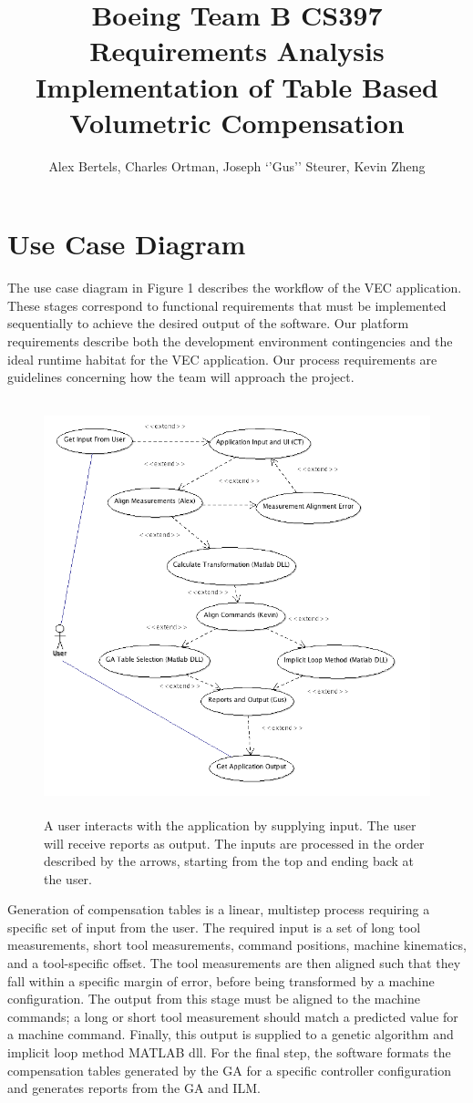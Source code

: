 \documentclass[pdftex,10pt,a4paper]{article}
\title{Boeing Team B CS397 Requirements Analysis\\
{\small Implementation of Table Based Volumetric Compensation} }
\author{Alex Bertels, Charles Ortman, Joseph `'Gus'' Steurer, Kevin Zheng}
\date{}
\begin{document}
\maketitle

\section*{Use Case Diagram}
The use case diagram in Figure 1 describes the workflow of the VEC application. These stages correspond to functional requirements that must be implemented sequentially to achieve the desired output of the software. Our platform requirements describe both the development environment contingencies and the ideal runtime habitat for the VEC application. Our process requirements are guidelines concerning how the team will approach the project.

\begin{figure}[ht!]
\centering
\includegraphics[width=120mm, height=120mm]{UML.png}
\caption{A user interacts with the application by supplying input. The user will receive reports as output. The inputs are processed in the order described by the arrows, starting from the top and ending back at the user.}
\end{figure}

Generation of compensation tables is a linear, multistep process requiring a specific set of input from the user. The required input is a set of long tool measurements, short tool measurements, command positions, machine kinematics, and a tool-specific offset. The tool measurements are then aligned such that they fall within a specific margin of error, before being transformed by a machine configuration. The output from this stage must be aligned to the machine commands; a long or short tool measurement should match a predicted value for a machine command. Finally, this output is supplied to a genetic algorithm and implicit loop method MATLAB  dll. For the final step, the software formats the compensation tables generated by the GA for a specific controller configuration and generates reports from the GA and ILM.
\end{document}
